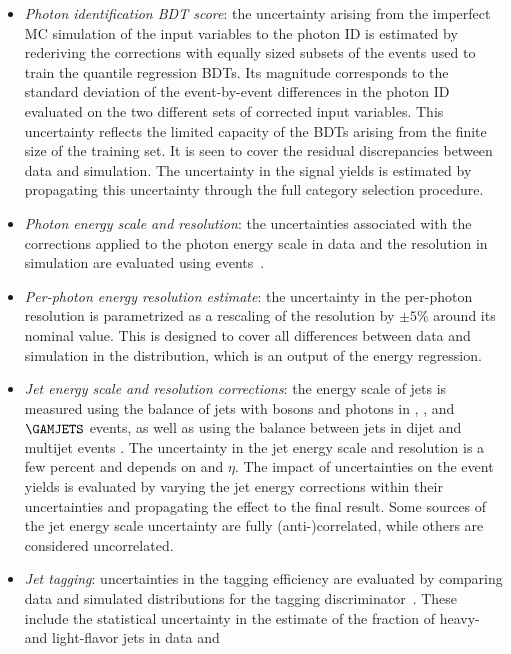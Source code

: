 \documentclass[11pt,a4paper,cmspaper,final,collab]{cms-tdr}
\begin{document}
\begin{itemize}
\item \textit{Photon identification BDT score}:
  the uncertainty arising from the imperfect MC simulation of the input variables to the photon ID 
  is estimated by rederiving the corrections with equally sized subsets 
of the \Zee events used to train the quantile regression BDTs. Its magnitude corresponds to the standard deviation of the event-by-event differences in the photon ID evaluated on the two different sets of corrected input variables.
This uncertainty reflects the limited capacity of the BDTs 
arising from the finite size of the training set. It is seen to cover the residual discrepancies between data and simulation. 
  The uncertainty in the signal yields is
  estimated by propagating this uncertainty through the full category selection procedure.
\item \textit{Photon energy scale and resolution}: 
  the uncertainties associated with the corrections applied to the photon energy scale in data
  and the resolution in simulation are evaluated using \Zee events~\cite{Khachatryan:2015iwa}.
\item \textit{Per-photon energy resolution estimate}: 
  the uncertainty in the per-photon resolution is
  parametrized as a rescaling of the resolution by
  $\pm 5\%$ around its nominal value. 
  This is designed to cover all differences between data and simulation 
  in the distribution, which is an output of the energy regression.
\item \textit{Jet energy scale and resolution corrections}: 
  the energy scale of jets is measured using the \pt balance of jets with \PZ bosons and photons in
  \Zee, \Zmumu, and $\GAMJETS$ events, as well as using the \pt balance between jets 
  in dijet and multijet events \cite{JetsInRun2,Khachatryan:2016kdb}. The uncertainty in the jet energy scale and resolution
  is a few percent and depends on \pt and $\eta$. The impact of uncertainties on the event yields is evaluated by varying the jet energy corrections within their uncertainties and 
  propagating the effect to the final result. Some sources of the jet energy scale uncertainty are fully (anti-)correlated, while others are considered uncorrelated.
\item \textit{Jet {\cPqb} tagging}: 
  uncertainties in the {\cPqb} tagging efficiency are evaluated 
  by comparing data and simulated distributions for the {\cPqb} tagging
  discriminator~\cite{CMSbtagging}. These include the statistical uncertainty in the
estimate of the fraction of heavy- and light-flavor jets in data and

\end{itemize}
\end{document}
